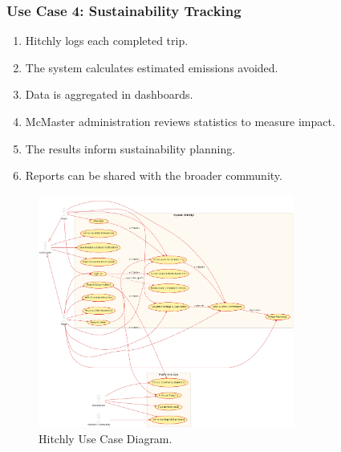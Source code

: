 \documentclass[12pt,letterpaper]{article}
\begin{document}
\subsubsection*{Use Case 4: Sustainability Tracking}
\begin{enumerate}
    \item Hitchly logs each completed trip.
    \item The system calculates estimated emissions avoided.
    \item Data is aggregated in dashboards.
    \item McMaster administration reviews statistics to measure impact.
    \item The results inform sustainability planning.
    \item Reports can be shared with the broader community.
\end{enumerate}

\begin{figure}[htbp]
  \centering
  \includegraphics[width=0.75\textwidth]{use-case.png}
  \caption{Hitchly Use Case Diagram.}
  \label{fig:ride-matching}
\end{figure}
\end{document}
